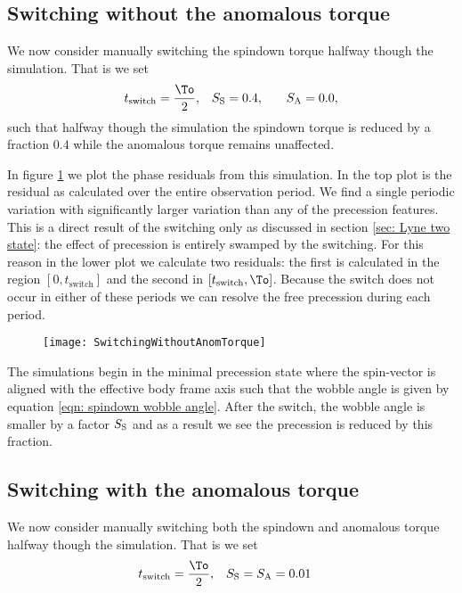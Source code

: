 \FloatBarrier
\subsection{Switching without the anomalous torque}
We now consider manually switching the spindown torque halfway though the simulation.
That is we set
\begin{align}
    t_{\mathrm{switch}} = \frac{\To}{2}, &&& \Ss = 0.4, &&& \Sa = 0.0,
\end{align}
such that halfway though the simulation the spindown torque is reduced by a
fraction $0.4$ while the anomalous torque remains unaffected. 

In figure \ref{fig: switching without anom} we plot the phase residuals from
this simulation. In the top plot is the residual as calculated over the entire
observation period. We find a single periodic variation with significantly
larger variation than any of the precession features. This is a direct result
of the switching only as discussed in section \ref{sec: Lyne two state}: the
effect of precession is entirely swamped by the switching. For this reason in
the lower plot we calculate two residuals: the first is calculated
in the region $[0, t_{\mathrm{switch}}]$ and the second in $[t_{\mathrm{switch}}, \To]$.
Because the switch does not occur in either of these periods we can resolve the
free precession during each period.

\begin{figure}[htb]
\texttt{[image: SwitchingWithoutAnomTorque]}
\caption{}
\label{fig: switching without anom}
\end{figure}

The simulations begin in the minimal precession state where the spin-vector
is aligned with the effective body frame axis such that the wobble angle is given
by equation \eqref{eqn: spindown wobble angle}. After the switch, the wobble
angle is smaller by a factor $S_{\mathrm{S}}$ and as a result we see the precession is
reduced by this fraction.


\FloatBarrier
\subsection{Switching with the anomalous torque}
We now consider manually switching both the spindown and anomalous torque
halfway though the simulation.  That is we set
\begin{align}
    t_{\mathrm{switch}} = \frac{\To}{2}, &&& \Ss = \Sa = 0.01
\end{align}

